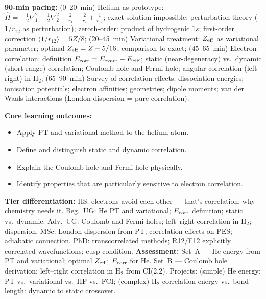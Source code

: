 \documentclass[11pt,a4paper]{article}
\begin{document}
\begin{tcolorbox}[chembox, title={Module~III.2 / L03: Polyelectronic Systems and Electron Correlation}]
\textbf{90-min pacing:} (0--20~min) Helium as prototype: $\hat{H}=-\tfrac{1}{2}\nabla_1^2-\tfrac{1}{2}\nabla_2^2-\tfrac{2}{r_1}-\tfrac{2}{r_2}+\tfrac{1}{r_{12}}$; exact solution impossible; perturbation theory ($1/r_{12}$ as perturbation); zeroth-order: product of hydrogenic $1s$; first-order correction $\langle1/r_{12}\rangle=5Z/8$; (20--45~min) Variational treatment: $Z_{\rm eff}$ as variational parameter; optimal $Z_{\rm eff}=Z-5/16$; comparison to exact; (45--65~min) Electron correlation: definition $E_{\rm corr}=E_{\rm exact}-E_{\rm HF}$; static (near-degeneracy) vs.\ dynamic (short-range) correlation; Coulomb hole and Fermi hole; angular correlation (left--right) in H$_2$; (65--90~min) Survey of correlation effects: dissociation energies; ionisation potentials; electron affinities; geometries; dipole moments; van der Waals interactions (London dispersion = pure correlation).

\medskip\textbf{Core learning outcomes:}
\begin{itemize}[leftmargin=1.4em,topsep=2pt,itemsep=1pt]
  \item Apply PT and variational method to the helium atom.
  \item Define and distinguish static and dynamic correlation.
  \item Explain the Coulomb hole and Fermi hole physically.
  \item Identify properties that are particularly sensitive to electron correlation.
\end{itemize}
\medskip\textbf{Tier differentiation:}
HS: electrons avoid each other --- that's correlation; why chemistry needs it.
Beg.\ UG: He PT and variational; $E_{\rm corr}$ definition; static vs.\ dynamic.
Adv.\ UG: Coulomb and Fermi holes; left--right correlation in H$_2$; dispersion.
MSc: London dispersion from PT; correlation effects on PES; adiabatic connection.
PhD: transcorrelated methods; R12/F12 explicitly correlated wavefunctions; cusp condition.
\medskip\textbf{Assessment:}
Set~A --- He energy from PT and variational; optimal $Z_{\rm eff}$; $E_{\rm corr}$ for He.
Set~B --- Coulomb hole derivation; left--right correlation in H$_2$ from CI(2,2).
Projects: (simple) He energy: PT vs.\ variational vs.\ HF vs.\ FCI; (complex) H$_2$ correlation energy vs.\ bond length: dynamic to static crossover.
\end{tcolorbox}
\end{document}
